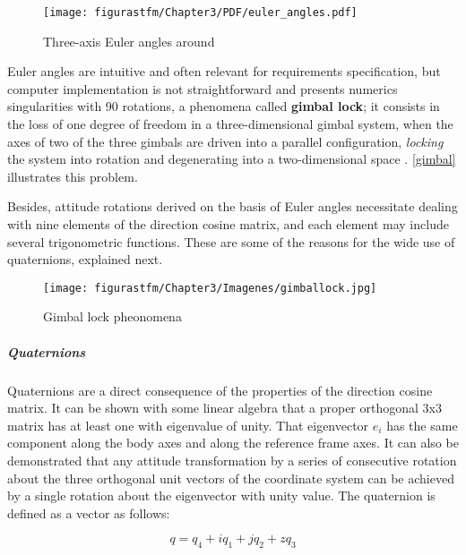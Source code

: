 			\begin{figure}[h]
				\centering
				\texttt{[image: figurastfm/Chapter3/PDF/euler\_angles.pdf]}
				\caption{Three-axis Euler angles around  \cite{ESA}}
				\label{fig:eulerangles}
			\end{figure}

Euler angles are intuitive and often relevant for requirements specification, but computer implementation is not straightforward and presents numerics singularities with 90\textdegree{} rotations, a phenomena called \textbf{gimbal lock}; it consists in the loss of one degree of freedom in a three-dimensional gimbal system, when the axes of two of the three gimbals are driven into a parallel configuration, \textit{locking} the system into rotation and degenerating into a two-dimensional space \cite{wiki}. \autoref{gimbal} illustrates this problem.
	
Besides, attitude rotations derived on the basis of Euler angles necessitate dealing with nine elements of the direction cosine matrix, and each element may include several trigonometric functions. These are some of the reasons for the wide use of quaternions, explained next.

	\begin{figure}[H]
				\centering
				\texttt{[image: figurastfm/Chapter3/Imagenes/gimballock.jpg]}
				\caption{Gimbal lock pheonomena \cite{gimbal}}
				\label{gimbal}
			\end{figure}


\subparagraph{Quaternions}\label{sec:quaternions}

Quaternions are a direct consequence of the properties of the direction cosine matrix. It can be shown with some linear algebra that a proper orthogonal 3x3 matrix has at least one  with eigenvalue of unity. That eigenvector $e_{i}$ has the same component along the body axes and along the reference frame axes. It can also be demonstrated that any attitude transformation by a series of consecutive rotation about the three orthogonal unit vectors of the coordinate system can be achieved by a single rotation about the eigenvector with unity value. The quaternion is defined as a vector as follows:

\begin{equation} 
q = q_{4} + iq_{1}+jq_{2}+zq_{3}
\end{equation}



